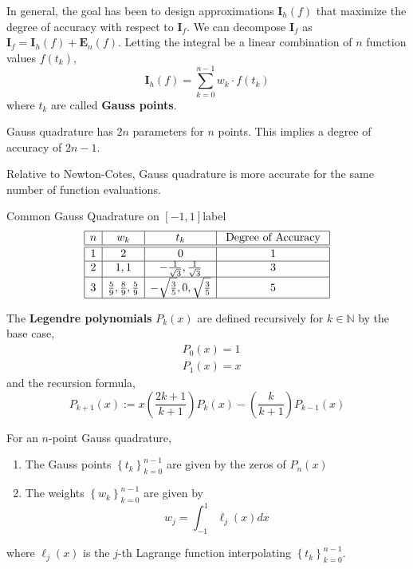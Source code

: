 \NewLine

\noindent In general, the goal has been to design approximations $\mathbf{I}_h(f)$ that maximize the degree of accuracy with respect to $\mathbf{I}_f$. We can decompose $\mathbf{I}_f$ as $\mathbf{I}_f = \mathbf{I}_h(f) + \mathbf{E}_n(f)$. Letting the integral be a linear combination of $n$ function values $f(t_k)$,
\[\mathbf{I}_h(f) = \sum_{k=0}^{n-1} w_k \cdot f\left(t_k\right)\] 
where $t_k$ are called \textbf{Gauss points}.

\begin{marginfigure}
	Gauss quadrature has $2n$ parameters for $n$ points. This implies a degree of accuracy of $2n - 1$.
\end{marginfigure}

\begin{rmk}
	Relative to Newton-Cotes, Gauss quadrature is more accurate for the same number of function evaluations.
\end{rmk}

\begin{ex}{Common Gauss Quadrature on $[-1,1]$}{label}
	\[
	\begin{array}{|c|c|c|c|}
		\hline n & w_k & t_k & \text { Degree of Accuracy } \\
		\hline \hline 1 & 2 & 0 & 1 \\
		\hline 2 & 1,1 & -\frac{1}{\sqrt{3}}, \frac{1}{\sqrt{3}} & 3 \\
		\hline 3 & \frac{5}{9}, \frac{8}{9}, \frac{5}{9} & -\sqrt{\frac{3}{5}}, 0, \sqrt{\frac{3}{5}} & 5 \\
		\hline
	\end{array}
	\]
\end{ex}

\begin{defn}
	The \textbf{Legendre polynomials} $P_k(x)$ are defined recursively for $k \in \mathbb{N}$ by the base case,
	\begin{align*}
		&P_0(x)=1 \\
		&P_1(x)= x
	 \end{align*}
	 and the recursion formula,
	 \[P_{k+1}(x):=x \left(\frac{2 k+1}{k+1}\right) P_k(x)-\left(\frac{k}{k+1}\right) P_{k-1}(x)\]
\end{defn}

\begin{thm}
	For an $n$-point Gauss quadrature,
	\begin{enumerate}
		\item The Gauss points $\left\{t_k\right\}_{k=0}^{n-1}$ are given by the zeros of $P_n(x)$ 
		\item The weights $\left\{w_k\right\}_{k=0}^{n-1}$ are given by
	\[w_j=\int_{-1}^1 \ell_j(x) d x\]
	\end{enumerate}
	where $\ell_j(x)$ is the $j$-th Lagrange function interpolating $\left\{t_k\right\}_{k=0}^{n-1}$.
\end{thm}

